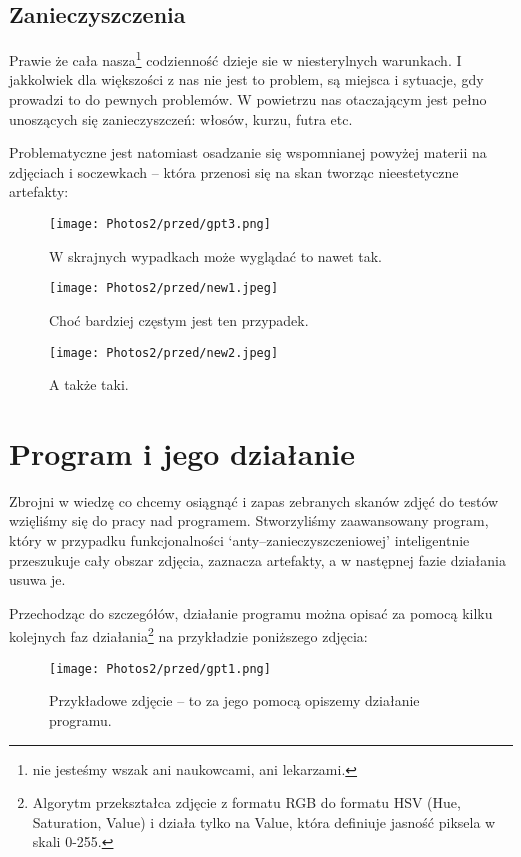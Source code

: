 \documentclass[]{mwart}
\begin{document}
\newpage
\subsection{Zanieczyszczenia}
Prawie że cała nasza\footnote{nie jesteśmy wszak ani naukowcami, ani lekarzami.} codzienność
dzieje sie w niesterylnych warunkach. I jakkolwiek dla większości z nas nie jest to problem, są miejsca i sytuacje,
gdy prowadzi to do pewnych problemów. W powietrzu nas otaczającym jest pełno unoszących się zanieczyszczeń: włosów, kurzu, futra etc.

Problematyczne jest natomiast osadzanie się wspomnianej powyżej materii na zdjęciach i soczewkach -- która przenosi się na
skan tworząc nieestetyczne artefakty:

\begin{figure}[H]
    \centering
    \texttt{[image: Photos2/przed/gpt3.png]}
    \caption{W skrajnych wypadkach może wyglądać to nawet tak.}
\end{figure}

\begin{figure}[H]
    \centering
    \texttt{[image: Photos2/przed/new1.jpeg]}
    \caption{Choć bardziej częstym jest ten przypadek.}
\end{figure}

\begin{figure}[H]
    \centering
    \texttt{[image: Photos2/przed/new2.jpeg]}
    \caption{A także taki.}
\end{figure}

\newpage
\section{Program i jego działanie}
Zbrojni w wiedzę co chcemy osiągnąć i zapas zebranych skanów zdjęć do testów wzięliśmy się do pracy
nad programem. Stworzyliśmy zaawansowany program, który w przypadku funkcjonalności
`anty--zanieczyszczeniowej' inteligentnie przeszukuje cały obszar zdjęcia, zaznacza artefakty,
a w następnej fazie działania usuwa je.

Przechodząc do szczegółów, działanie programu można opisać za pomocą kilku kolejnych faz działania\footnote{Algorytm
    przekształca zdjęcie z formatu RGB do formatu HSV (Hue, Saturation, Value) i działa tylko na Value, która definiuje jasność piksela w skali 0-255.} na przykładzie poniższego zdjęcia:

\begin{figure}[H]
    \centering
    \texttt{[image: Photos2/przed/gpt1.png]}
    \caption{Przykładowe zdjęcie -- to za jego pomocą opiszemy działanie programu.}
\end{figure}
\end{document}
